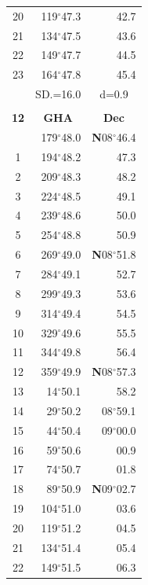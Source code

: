 \documentclass[10pt, a4paper]{report}
\begin{document}
\begin{scriptsize}
\begin{tabular*}{0.2\textwidth}[t]{@{\extracolsep{\fill}}|c|rr|}
20 & 119$^\circ$47.3 & 42.7\\
21 & 134$^\circ$47.5 & \raisebox{0.24ex}{\boldmath$\cdot$~\boldmath$\cdot$~~}43.6\\
22 & 149$^\circ$47.7 & 44.5\\
23 & 164$^\circ$47.8 & 45.4\\
\hline
\rule{0pt}{2.4ex} & \multicolumn{1}{c}{SD.=16.0} & \multicolumn{1}{c|}{d=0.9}\\
\hline
\multicolumn{1}{c}{}\\[-0.5ex]\hline
\multicolumn{1}{|c|}{\rule{0pt}{2.6ex}\textbf{12}} & \multicolumn{1}{c}{\textbf{GHA}} & \multicolumn{1}{c|}{\textbf{Dec}}\\
\hline\rule{0pt}{2.6ex}\noindent
0 & 179$^\circ$48.0 & \textbf{N}08$^\circ$46.4\\
1 & 194$^\circ$48.2 & 47.3\\
2 & 209$^\circ$48.3 & 48.2\\
3 & 224$^\circ$48.5 & \raisebox{0.24ex}{\boldmath$\cdot$~\boldmath$\cdot$~~}49.1\\
4 & 239$^\circ$48.6 & 50.0\\
5 & 254$^\circ$48.8 & 50.9\\[2Pt]
6 & 269$^\circ$49.0 & \textbf{N}08$^\circ$51.8\\
7 & 284$^\circ$49.1 & 52.7\\
8 & 299$^\circ$49.3 & 53.6\\
9 & 314$^\circ$49.4 & \raisebox{0.24ex}{\boldmath$\cdot$~\boldmath$\cdot$~~}54.5\\
10 & 329$^\circ$49.6 & 55.5\\
11 & 344$^\circ$49.8 & 56.4\\[2Pt]
12 & 359$^\circ$49.9 & \textbf{N}08$^\circ$57.3\\
13 & 14$^\circ$50.1 & 58.2\\
14 & 29$^\circ$50.2 & 08$^\circ$59.1\\
15 & 44$^\circ$50.4 & 09$^\circ$00.0\\
16 & 59$^\circ$50.6 & 00.9\\
17 & 74$^\circ$50.7 & 01.8\\[2Pt]
18 & 89$^\circ$50.9 & \textbf{N}09$^\circ$02.7\\
19 & 104$^\circ$51.0 & 03.6\\
20 & 119$^\circ$51.2 & 04.5\\
21 & 134$^\circ$51.4 & \raisebox{0.24ex}{\boldmath$\cdot$~\boldmath$\cdot$~~}05.4\\
22 & 149$^\circ$51.5 & 06.3\\

\end{tabular*}
\end{scriptsize}
\end{document}
